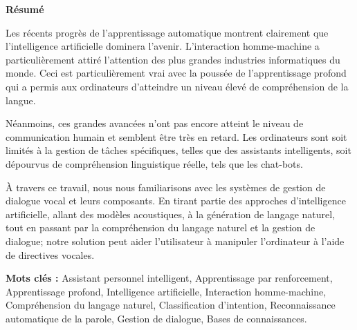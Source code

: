 \begin{center}
    \Large 
    \textbf{Résumé}
\end{center}
\setlength{\parindent}{0.4cm}
Les récents progrès de l'apprentissage automatique montrent clairement que l'intelligence artificielle dominera l'avenir.
L'interaction homme-machine a particulièrement attiré l'attention des plus grandes industries informatiques du monde. Ceci est particulièrement vrai avec la poussée de l'apprentissage profond qui a permis aux ordinateurs d'atteindre un niveau élevé de compréhension de la langue.
\par 
Néanmoins, ces grandes avancées n'ont pas encore atteint le niveau de communication humain et semblent être très en retard.
Les ordinateurs sont soit limités à la gestion de tâches spécifiques, telles que des assistants intelligents, soit dépourvus de compréhension linguistique réelle, tels que les chat-bots.
\par 
À travers ce travail, nous nous familiarisons avec les systèmes de gestion de dialogue vocal et leurs composants.
En tirant partie des approches d'intelligence artificielle, allant des modèles acoustiques, à la génération de langage naturel, tout  en passant par la compréhension du langage naturel et la  gestion de dialogue; notre solution peut aider l'utilisateur à manipuler l'ordinateur à l'aide de directives vocales.
\par
\noindent
\textbf{Mots clés :} Assistant personnel intelligent, Apprentissage par renforcement, Apprentissage profond, Intelligence artificielle, Interaction homme-machine, Compréhension du langage naturel, Classification d'intention, Reconnaissance automatique de la parole, Gestion de dialogue, Bases de connaissances.

\vspace*{0.8cm}

